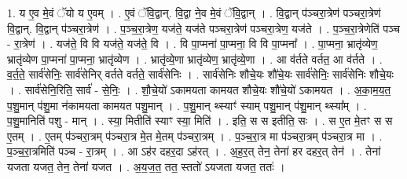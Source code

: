 \documentclass[17pt]{extarticle}
\begin{document}
1. य ए॒व मे॒वं ॅयो य ए॒वम् । . ए॒वं ॅवि॒द्वान्. वि॒द्वा ने॒व मे॒वं ॅवि॒द्वान् । . वि॒द्वान् प॑ञ्चरा॒त्रेण॑ पञ्चरा॒त्रेण॑ वि॒द्वान्. वि॒द्वान् प॑ञ्चरा॒त्रेण॑ । . प॒ञ्च॒रा॒त्रेण॒ यज॑ते॒ यज॑ते पञ्चरा॒त्रेण॑ पञ्चरा॒त्रेण॒ यज॑ते । . प॒ञ्च॒रा॒त्रेणेति॑ पञ्च - रा॒त्रेण॑ । . यज॑ते॒ वि वि यज॑ते॒ यज॑ते॒ वि । . वि पा॒प्मना॑ पा॒प्मना॒ वि वि पा॒प्मना᳚ । . पा॒प्मना॒ भ्रातृ॑व्येण॒ भ्रातृ॑व्येण पा॒प्मना॑ पा॒प्मना॒ भ्रातृ॑व्येण । . भ्रातृ॑व्ये॒णा भ्रातृ॑व्येण॒ भ्रातृ॑व्ये॒णा । . आ व॑र्तते वर्तत॒ आ व॑र्तते । . व॒र्त॒ते॒ सार्व॑सेनिः॒ सार्व॑सेनिर् वर्तते वर्तते॒ सार्व॑सेनिः । . सार्व॑सेनिः शौचे॒यः शौ॑चे॒यः सार्व॑सेनिः॒ सार्व॑सेनिः शौचे॒यः । . सार्व॑सेनि॒रिति॒ सार्व॑ - से॒निः॒ । . शौ॒चे॒यो॑ ऽकामयता कामयत शौचे॒यः शौ॑चे॒यो॑ ऽकामयत । . अ॒का॒म॒य॒त॒ प॒शु॒मान् प॑शु॒मा न॑कामयता कामयत पशु॒मान् । . प॒शु॒मान् थ्स्याꣳ॑ स्याम् पशु॒मान् प॑शु॒मान् थ्स्या᳚म् । . प॒शु॒मानिति॑ पशु - मान् । . स्या॒ मितीति॑ स्याꣳ स्या॒ मिति॑ । . इति॒ स स इतीति॒ सः । . स ए॒त मे॒तꣳ स स ए॒तम् । . ए॒तम् प॑ञ्चरा॒त्रम् प॑ञ्चरा॒त्र मे॒त मे॒तम् प॑ञ्चरा॒त्रम् । . प॒ञ्च॒रा॒त्र मा प॑ञ्चरा॒त्रम् प॑ञ्चरा॒त्र मा । . प॒ञ्च॒रा॒त्रमिति॑ पञ्च - रा॒त्रम् । . आ ऽह॑र दहर॒दा ऽह॑रत् । . अ॒ह॒र॒त् तेन॒ तेना॑ हर दहर॒त् तेन॑ । . तेना॑ यजता यजत॒ तेन॒ तेना॑ यजत । . अ॒य॒ज॒त॒ तत॒ स्ततो॑ ऽयजता यजत॒ ततः॑ । \newline
\end{document}
